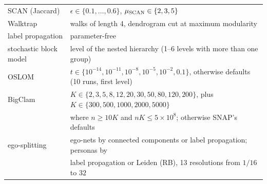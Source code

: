 \begin{table}[tbp]
\begin{ruledtabular}
\begin{tabular}{ll}
SCAN (Jaccard) & $\epsilon\in\{0.1,\dots,0.6\}$, $\mu_{\rm SCAN}\in\{2,3,5\}$ \\
Walktrap & walks of length 4, dendrogram cut at maximum modularity \\
label propagation & parameter-free \\
stochastic block model & level of the nested hierarchy (1--6 levels with more than one group) \\
OSLOM & $t\in\{10^{-14},10^{-11},10^{-8},10^{-5},10^{-2},0.1\}$, otherwise defaults (10 runs, first level) \\
BigClam & $K\in\{2,3,5,8,12,20,30,50,80,120,200\}$, plus $K\in\{300,500,1000,2000,5000\}$ \\
 & where $n\ge10K$ and $nK\le5\times10^{8}$; otherwise SNAP's defaults \\
ego-splitting & ego-nets by connected components or label propagation; personas by \\
 & label propagation or Leiden (RB), 13 resolutions from $1/16$ to $32$ \\
\end{tabular}
\end{ruledtabular}
\end{table}


